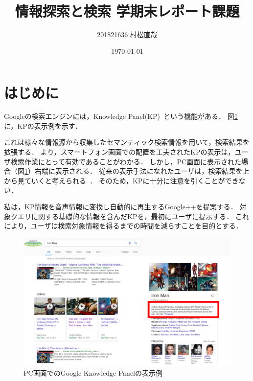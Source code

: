 \documentclass[pdflatex,ja=standard]{bxjsarticle}
\title{情報探索と検索 学期末レポート課題}
\author{201821636 村松直哉}
\date{\today}
\begin{document}
\maketitle
%
%



\section{はじめに}
Googleの検索エンジンには，\textrm{Knowledge Panel}(KP)~\cite{Amit2012}という機能がある．
図\ref{fig:knowledgepanel}に，KPの表示例を示す．

これは様々な情報源から収集したセマンティック検索情報を用いて，検索結果を拡張する．
\cite{Lagun}より，スマートフォン画面での配置を工夫されたKPの表示は，ユーザ検索作業にとって有効であることがわかる．
しかし，PC画面に表示された場合（図\ref{fig:knowledgepanel}）右端に表示される．
従来の表示手法になれたユーザは，検索結果を上から見ていくと考えられる~\cite{Granka2004}．
そのため，KPに十分に注意を引くことができない．

私は，KP情報を音声情報に変換し自動的に再生する\textrm{Google++}を提案する．
対象クエリに関する基礎的な情報を含んだKPを，最初にユーザに提示する．
これにより，ユーザは検索対象情報を得るまでの時間を減らすことを目的とする．

\begin{figure}[htb]
\begin{center}
    \includegraphics[width=14cm]{figs/ironman.png}
\end{center}
\caption{PC画面でのGoogle Knowledge Panelの表示例}
\label{fig:knowledgepanel}
\end{figure}
\end{document}
